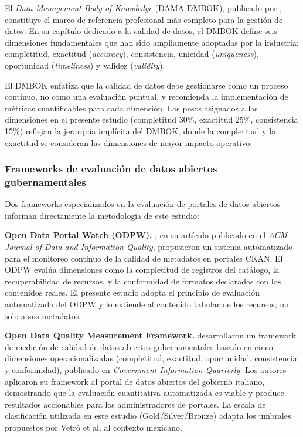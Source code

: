 \documentclass[12pt,letterpaper]{article}
\begin{document}
El \textit{Data Management Body of Knowledge} (DAMA-DMBOK), publicado por \textcite{dama2017}, constituye el marco de referencia profesional más completo para la gestión de datos. En su capítulo dedicado a la calidad de datos, el DMBOK define seis dimensiones fundamentales que han sido ampliamente adoptadas por la industria: completitud, exactitud (\textit{accuracy}), consistencia, unicidad (\textit{uniqueness}), oportunidad (\textit{timeliness}) y validez (\textit{validity}).

El DMBOK enfatiza que la calidad de datos debe gestionarse como un proceso continuo, no como una evaluación puntual, y recomienda la implementación de métricas cuantificables para cada dimensión. Los pesos asignados a las dimensiones en el presente estudio (completitud 30\%, exactitud 25\%, consistencia 15\%) reflejan la jerarquía implícita del DMBOK, donde la completitud y la exactitud se consideran las dimensiones de mayor impacto operativo.

\subsubsection{Frameworks de evaluación de datos abiertos gubernamentales}

Dos frameworks especializados en la evaluación de portales de datos abiertos informan directamente la metodología de este estudio:

\textbf{Open Data Portal Watch (ODPW).} \textcite{neumaier2016}, en su artículo publicado en el \textit{ACM Journal of Data and Information Quality}, propusieron un sistema automatizado para el monitoreo continuo de la calidad de metadatos en portales CKAN. El ODPW evalúa dimensiones como la completitud de registros del catálogo, la recuperabilidad de recursos, y la conformidad de formatos declarados con los contenidos reales. El presente estudio adopta el principio de evaluación automatizada del ODPW y lo extiende al contenido tabular de los recursos, no solo a sus metadatos.

\textbf{Open Data Quality Measurement Framework.} \textcite{vetro2016} desarrollaron un framework de medición de calidad de datos abiertos gubernamentales basado en cinco dimensiones operacionalizadas (completitud, exactitud, oportunidad, consistencia y conformidad), publicado en \textit{Government Information Quarterly}. Los autores aplicaron su framework al portal de datos abiertos del gobierno italiano, demostrando que la evaluación cuantitativa automatizada es viable y produce resultados accionables para los administradores de portales. La escala de clasificación utilizada en este estudio (Gold/Silver/Bronze) adapta los umbrales propuestos por Vetrò et al. al contexto mexicano.
\end{document}
